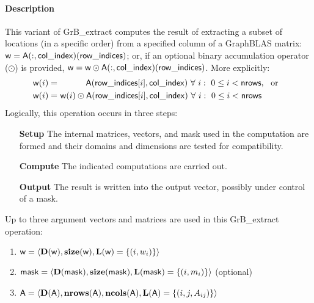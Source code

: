 \paragraph{Description}

This variant of {\sf GrB\_extract} computes the result of extracting a subset of
locations (in a specific order) from a specified column of a GraphBLAS matrix: 
${\sf w} = {\sf A}(:,{\sf col\_index})({\sf row\_indices})$; or, if an 
optional binary accumulation operator ($\odot$) is provided, 
${\sf w} = {\sf w} \odot {\sf A}(:,{\sf col\_index})({\sf row\_indices})$.  
More explicitly:
\[
\begin{aligned}
    {\sf w}(i) = &\ \ \ \ \ \ \ \ \ \ {\sf A}({\sf row\_indices}[i],{\sf col\_index}) 
    \ \forall \ i : \ 0 \leq i < {\sf nrows}, \mbox{~~or~~}
    \\
    {\sf w}(i) = &\ {\sf w}(i) \odot {\sf A}({\sf row\_indices}[i],{\sf col\_index})
    \ \forall \ i : \ 0 \leq i < {\sf nrows}
\end{aligned}
\]
Logically, this operation occurs in three steps:
\begin{enumerate}[leftmargin=0.75in]
\item[\bf Setup] The internal matrices, vectors, and mask used in the computation are formed 
and their domains and dimensions are tested for compatibility.
\item[\bf Compute] The indicated computations are carried out.
\item[\bf Output] The result is written into the output vector, possibly under 
control of a mask.
\end{enumerate}

Up to three argument vectors and matrices are used in this {\sf GrB\_extract} 
operation:
\begin{enumerate}
	\item ${\sf w} = \langle \bold{D}({\sf w}),\bold{size}({\sf w}),
    \bold{L}({\sf w}) = \{(i,w_i) \} \rangle$

	\item ${\sf mask} = \langle \bold{D}({\sf mask}),\bold{size}({\sf mask}),
    \bold{L}({\sf mask}) = \{(i,m_i) \} \rangle$ (optional)

	\item ${\sf A} = \langle \bold{D}({\sf A}),\bold{nrows}({\sf A}),
    \bold{ncols}({\sf A}),\bold{L}({\sf A}) = \{(i,j,A_{ij}) \} \rangle$
\end{enumerate}


